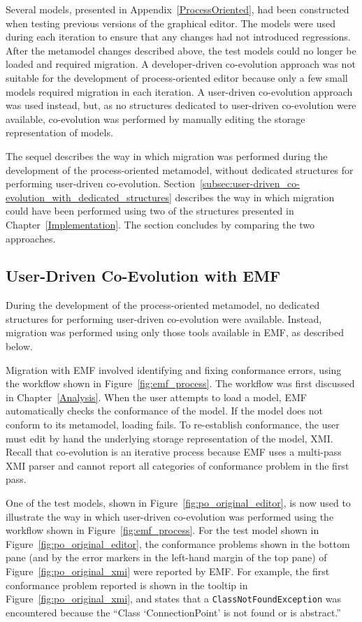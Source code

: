 Several models, presented in Appendix~\ref{ProcessOriented}, had been constructed when testing previous versions of the graphical editor. The models were used during each iteration to ensure that any changes had not introduced regressions. After the metamodel changes described above, the test models could no longer be loaded and required migration. A developer-driven co-evolution approach was not suitable for the development of process-oriented editor because only a few small models required migration in each iteration. A user-driven co-evolution approach was used instead, but, as no structures dedicated to user-driven co-evolution were available, co-evolution was performed by manually editing the storage representation of models. 

The sequel describes the way in which migration was performed during the development of the process-oriented metamodel, without dedicated structures for performing user-driven co-evolution. Section~\ref{subsec:user-driven_co-evolution_with_dedicated_structures} describes the way in which migration could have been performed using two of the structures presented in Chapter~\ref{Implementation}. The section concludes by comparing the two approaches.

\subsection{User-Driven Co-Evolution with EMF}
\label{subsec:user-driven_co-evolution_with_emf}
During the development of the process-oriented metamodel, no dedicated structures for performing user-driven co-evolution were available. Instead, migration was performed using only those tools available in EMF, as described below.

Migration with EMF involved identifying and fixing conformance errors, using the workflow shown in Figure~\ref{fig:emf_process}. The workflow was first discussed in Chapter~\ref{Analysis}. When the user attempts to load a model, EMF automatically checks the conformance of the model. If the model does not conform to its metamodel, loading fails. To re-establish conformance, the user must edit by hand the underlying storage representation of the model, XMI. Recall that co-evolution is an iterative process because EMF uses a multi-pass XMI parser and cannot report all categories of conformance problem in the first pass.

One of the test models, shown in Figure~\ref{fig:po_original_editor}, is now used to illustrate the way in which user-driven co-evolution was performed using the workflow shown in Figure~\ref{fig:emf_process}. For the test model shown in Figure~\ref{fig:po_original_editor}, the conformance problems shown in the bottom pane (and by the error markers in the left-hand margin of the top pane) of Figure~\ref{fig:po_original_xmi} were reported by EMF. For example, the first conformance problem reported is shown in the tooltip in Figure~\ref{fig:po_original_xmi}, and states that a \texttt{ClassNotFoundException} was encountered because the ``Class `ConnectionPoint' is not found or is abstract.''

